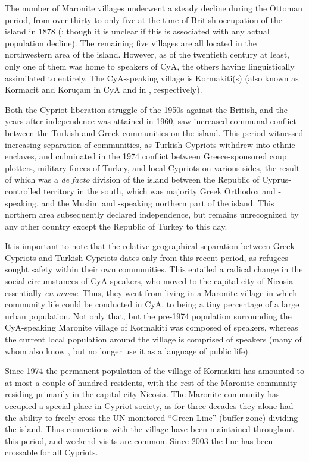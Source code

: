 \documentclass[output=paper]{langsci/langscibook}
\begin{document}
The number of Maronite villages underwent a steady decline during the Ottoman period, from over thirty to only five at the time of British occupation of the island in 1878 (\citealt{BaiderKariolemou2015}; though it is unclear if this is associated with any actual population decline). The remaining five villages are all located in the northwestern area of the island. However, as of the twentieth century at least, only one of them was home to speakers of CyA, the others having linguistically assimilated to  entirely. The CyA-speaking village is {Kormakiti}(s) (also known as Kormacit and Koruçam in CyA and in , respectively).

Both the Cypriot liberation struggle of the 1950s against the British, and the years after independence was attained in 1960, saw increased communal conflict between the Turkish and Greek communities on the island. This period witnessed increasing separation of communities, as Turkish Cypriots withdrew into ethnic enclaves, and  culminated in the 1974 conflict between Greece-sponsored coup plotters, military forces of Turkey, and local Cypriots on various sides, the result of which was a \textit{de} \textit{facto} division of the island between the Republic of Cyprus-controlled territory in the south, which was majority Greek Orthodox and -speaking, and the Muslim and -speaking northern part of the island. This northern area subsequently declared independence, but remains unrecognized by any other country except the Republic of Turkey to this day.

It is important to note that the {relative} geographical separation between Greek Cypriots and Turkish Cypriots dates only from this recent period, as refugees sought safety within their own communities. This entailed a radical change in the social circumstances of CyA speakers, who moved to the capital city of Nicosia essentially \textit{en} \textit{masse}. Thus, they went from living in a Maronite village in which community life could be conducted in CyA, to being a tiny percentage of a large urban population. Not only that, but the pre-1974 population surrounding the CyA-speaking Maronite village of {Kormakiti} was composed of  speakers, whereas the current local population around the village is comprised of  speakers (many of whom also know , but no longer use it as a language of public life).


Since 1974 the permanent population of the village of {Kormakiti} has amounted to at most a couple of hundred residents, with the rest of the Maronite community residing primarily in the capital city Nicosia. The Maronite community has occupied a special place in Cypriot society, as for three decades they alone had the ability to freely cross the UN-monitored “Green Line” (buffer zone) dividing the island. Thus connections with the village have been maintained throughout this period, and weekend visits are common. Since 2003 the line has been crossable for all Cypriots.
\end{document}
